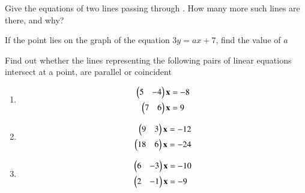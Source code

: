 %
\item Give the equations of two lines passing through . How many more such lines are there, and why?
\item If the point  lies on the graph of the equation $3y = ax + 7$, find the value of $a$
\\
\solution

\item Find out whether the lines representing the
following pairs of linear equations intersect at a point, are parallel or coincident
%
\begin{enumerate}[itemsep=2pt]
\item
\begin{align}
\begin{split}
\begin{pmatrix}5 & -4 \end{pmatrix}\mathbf{x}&=-8
\\
\begin{pmatrix}7 & 6 \end{pmatrix}\mathbf{x}&=9
\end{split}
\label{line/6/1.0.1}
\end{align}
\item
\begin{align}
\begin{split}
\begin{pmatrix}9 & 3 \end{pmatrix}\mathbf{x}&=-12
\\
\begin{pmatrix}18 & 6 \end{pmatrix}\mathbf{x}&=-24
\end{split}
\label{line/6/1.0.2}
\end{align}
\item
\begin{align}
\begin{split}
\begin{pmatrix}6 & -3 \end{pmatrix}\mathbf{x}&=-10
\\
\begin{pmatrix}2 & -1 \end{pmatrix}\mathbf{x}&=-9
\end{split}
\label{line/6/1.0.3}
\end{align}
\end{enumerate}
%
\solution


